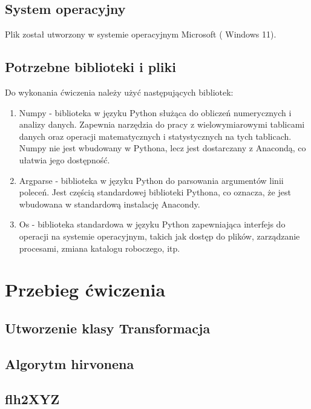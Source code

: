 \documentclass[10pt,a4paper]{article}
\begin{document}
	\subsection{System operacyjny}
	
	Plik został utworzony w systemie operacyjnym Microsoft ( Windows 11).
	
	\subsection{Potrzebne biblioteki i pliki}
	
	Do wykonania ćwiczenia należy użyć następujących bibliotek:
	\begin{enumerate}

	\item Numpy - biblioteka w języku Python służąca do obliczeń numerycznych i analizy danych. Zapewnia narzędzia do pracy z wielowymiarowymi tablicami danych oraz operacji matematycznych i statystycznych na tych tablicach. Numpy nie jest wbudowany w Pythona, lecz jest dostarczany z Anacondą, co ułatwia jego dostępność.
	\item Argparse - biblioteka w języku Python do parsowania argumentów linii poleceń. Jest częścią standardowej biblioteki Pythona, co oznacza, że jest wbudowana w standardową instalację Anacondy.
	\item Os - biblioteka standardowa w języku Python zapewniająca interfejs do operacji na systemie operacyjnym, takich jak dostęp do plików, zarządzanie procesami, zmiana katalogu roboczego, itp.	
		
	\end{enumerate}
	\section{Przebieg ćwiczenia}
	
	\subsection{Utworzenie klasy Transformacja}

	\subsection{Algorytm hirvonena} 

	
	\subsection{flh2XYZ} 
\end{document}
